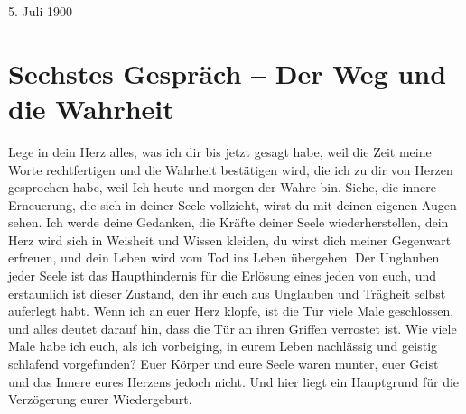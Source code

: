 5. Juli 1900



\section{Sechstes Gespräch -- Der Weg und die Wahrheit}




Lege in dein Herz alles, was ich dir bis jetzt gesagt habe, weil die Zeit meine Worte rechtfertigen und die Wahrheit bestätigen wird, die ich zu dir von Herzen gesprochen habe, weil Ich heute und morgen der Wahre bin. Siehe, die innere Erneuerung, die sich in deiner Seele vollzieht, wirst du mit deinen eigenen Augen sehen. Ich werde deine Gedanken, die Kräfte deiner Seele wiederherstellen, dein Herz wird sich in Weisheit und Wissen kleiden, du wirst dich meiner Gegenwart erfreuen, und dein Leben wird vom Tod ins Leben übergehen. Der Unglauben jeder Seele ist das Haupthindernis für die Erlösung eines jeden von euch, und erstaunlich ist dieser Zustand, den ihr euch aus Unglauben und Trägheit selbst auferlegt habt. Wenn ich an euer Herz klopfe, ist die Tür viele Male geschlossen, und alles deutet darauf hin, dass die Tür an ihren Griffen verrostet ist. Wie viele Male habe ich euch, als ich vorbeiging, in eurem Leben nachlässig und geistig schlafend vorgefunden? Euer Körper und eure Seele waren munter, euer Geist und das Innere eures Herzens jedoch nicht. Und hier liegt ein Hauptgrund für die Verzögerung eurer Wiedergeburt. 

